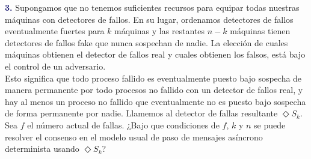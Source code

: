 \textbf{\textcolor{MidnightBlue}{3.}}
Supongamos que no tenemos suficientes recursos para equipar todas nuestras máquinas
con detectores de fallos. En su lugar, ordenamos detectores de fallos eventualmente
fuertes para $k$ máquinas y las restantes $n-k$ máquinas tienen detectores de fallos
fake que nunca sospechan de nadie. La elección de cuales máquinas obtienen el
detector 
de fallos real y cuales obtienen los falsos, está bajo el control de un adversario.\\

Esto significa que todo proceso fallido es eventualmente puesto bajo sospecha de
manera permanente por todo procesos no fallido con un detector de fallos real, y hay
al menos un proceso no fallido que eventualmente no es puesto bajo sospecha de forma
permanente por nadie. Llamemos al detector de fallas resultante $\Diamond S_k$.\\

Sea $f$ el número actual de fallas. ¿Bajo que condiciones de $f$, $k$ y $n$ se puede
resolver el consenso en el modelo usual de paso de mensajes asíncrono determinista
usando $\Diamond S_k$?\\
